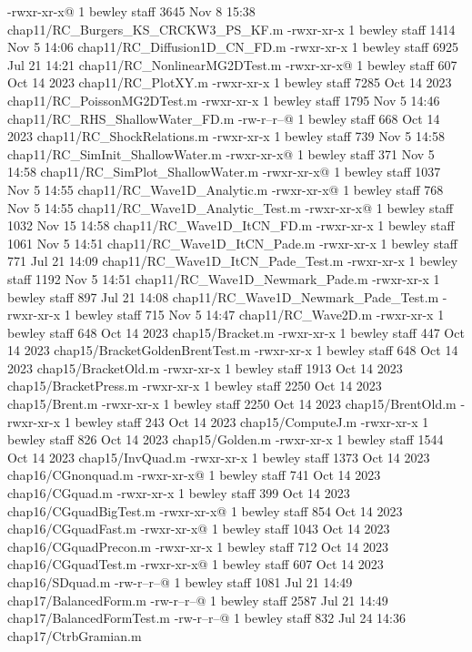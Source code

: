 -rwxr-xr-x@ 1 bewley  staff   3645 Nov  8 15:38 chap11/RC_Burgers_KS_CRCKW3_PS_KF.m
-rwxr-xr-x  1 bewley  staff   1414 Nov  5 14:06 chap11/RC_Diffusion1D_CN_FD.m
-rwxr-xr-x  1 bewley  staff   6925 Jul 21 14:21 chap11/RC_NonlinearMG2DTest.m
-rwxr-xr-x@ 1 bewley  staff    607 Oct 14  2023 chap11/RC_PlotXY.m
-rwxr-xr-x  1 bewley  staff   7285 Oct 14  2023 chap11/RC_PoissonMG2DTest.m
-rwxr-xr-x  1 bewley  staff   1795 Nov  5 14:46 chap11/RC_RHS_ShallowWater_FD.m
-rw-r--r--@ 1 bewley  staff    668 Oct 14  2023 chap11/RC_ShockRelations.m
-rwxr-xr-x  1 bewley  staff    739 Nov  5 14:58 chap11/RC_SimInit_ShallowWater.m
-rwxr-xr-x@ 1 bewley  staff    371 Nov  5 14:58 chap11/RC_SimPlot_ShallowWater.m
-rwxr-xr-x@ 1 bewley  staff   1037 Nov  5 14:55 chap11/RC_Wave1D_Analytic.m
-rwxr-xr-x@ 1 bewley  staff    768 Nov  5 14:55 chap11/RC_Wave1D_Analytic_Test.m
-rwxr-xr-x@ 1 bewley  staff   1032 Nov 15 14:58 chap11/RC_Wave1D_ItCN_FD.m
-rwxr-xr-x  1 bewley  staff   1061 Nov  5 14:51 chap11/RC_Wave1D_ItCN_Pade.m
-rwxr-xr-x  1 bewley  staff    771 Jul 21 14:09 chap11/RC_Wave1D_ItCN_Pade_Test.m
-rwxr-xr-x  1 bewley  staff   1192 Nov  5 14:51 chap11/RC_Wave1D_Newmark_Pade.m
-rwxr-xr-x  1 bewley  staff    897 Jul 21 14:08 chap11/RC_Wave1D_Newmark_Pade_Test.m
-rwxr-xr-x  1 bewley  staff    715 Nov  5 14:47 chap11/RC_Wave2D.m
-rwxr-xr-x  1 bewley  staff    648 Oct 14  2023 chap15/Bracket.m
-rwxr-xr-x  1 bewley  staff    447 Oct 14  2023 chap15/BracketGoldenBrentTest.m
-rwxr-xr-x  1 bewley  staff    648 Oct 14  2023 chap15/BracketOld.m
-rwxr-xr-x  1 bewley  staff   1913 Oct 14  2023 chap15/BracketPress.m
-rwxr-xr-x  1 bewley  staff   2250 Oct 14  2023 chap15/Brent.m
-rwxr-xr-x  1 bewley  staff   2250 Oct 14  2023 chap15/BrentOld.m
-rwxr-xr-x  1 bewley  staff    243 Oct 14  2023 chap15/ComputeJ.m
-rwxr-xr-x  1 bewley  staff    826 Oct 14  2023 chap15/Golden.m
-rwxr-xr-x  1 bewley  staff   1544 Oct 14  2023 chap15/InvQuad.m
-rwxr-xr-x  1 bewley  staff   1373 Oct 14  2023 chap16/CGnonquad.m
-rwxr-xr-x@ 1 bewley  staff    741 Oct 14  2023 chap16/CGquad.m
-rwxr-xr-x  1 bewley  staff    399 Oct 14  2023 chap16/CGquadBigTest.m
-rwxr-xr-x@ 1 bewley  staff    854 Oct 14  2023 chap16/CGquadFast.m
-rwxr-xr-x@ 1 bewley  staff   1043 Oct 14  2023 chap16/CGquadPrecon.m
-rwxr-xr-x  1 bewley  staff    712 Oct 14  2023 chap16/CGquadTest.m
-rwxr-xr-x@ 1 bewley  staff    607 Oct 14  2023 chap16/SDquad.m
-rw-r--r--@ 1 bewley  staff   1081 Jul 21 14:49 chap17/BalancedForm.m
-rw-r--r--@ 1 bewley  staff   2587 Jul 21 14:49 chap17/BalancedFormTest.m
-rw-r--r--@ 1 bewley  staff    832 Jul 24 14:36 chap17/CtrbGramian.m
